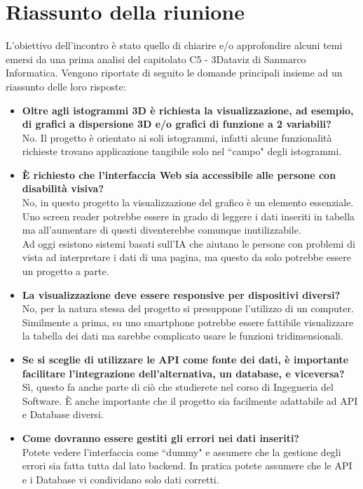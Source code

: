 \section{Riassunto della riunione}
L'obiettivo dell'incontro  è stato quello di chiarire e/o approfondire alcuni temi emersi da una prima analisi del capitolato C5 - 3Dataviz di Sanmarco Informatica.
Vengono riportate di seguito le domande principali insieme ad un riassunto delle loro risposte:
\begin{itemize}
    \item \textbf{Oltre agli istogrammi 3D è richiesta la visualizzazione, ad esempio, di grafici a dispersione 3D e/o grafici di funzione a 2 variabili?}\\
    No. Il progetto è orientato ai soli istogrammi, infatti alcune funzionalità richieste trovano applicazione tangibile solo nel ``campo" degli istogrammi.
    \item \textbf{È richiesto che l'interfaccia Web sia accessibile alle persone con disabilità visiva?}\\
    No, in questo progetto la visualizzazione del grafico è un elemento essenziale. Uno screen reader potrebbe essere in grado di leggere i dati inseriti in tabella ma all'aumentare di questi diventerebbe comunque inutilizzabile.\\
    Ad oggi esistono sistemi basati sull'IA che aiutano le persone con problemi di vista ad interpretare i dati di una pagina, ma questo da solo potrebbe essere un progetto a parte.
    \item \textbf{La visualizzazione deve essere responsive per dispositivi diversi?}\\
    No, per la natura stessa del progetto si presuppone l'utilizzo di un computer.\\
    Similmente a prima, su uno smartphone potrebbe essere fattibile visualizzare la tabella dei dati ma sarebbe complicato usare le funzioni tridimensionali.
    \item \textbf{Se si sceglie di utilizzare le API come fonte dei dati, è importante facilitare l'integrazione dell'alternativa, un database, e viceversa?}\\
    Sì, questo fa anche parte di ciò che studierete nel corso di Ingegneria del Software. È anche importante che il progetto sia facilmente adattabile ad API e Database diversi.
    \item \textbf{Come dovranno essere gestiti gli errori nei dati inseriti?}\\
    Potete vedere l'interfaccia come ``dummy" e assumere che la gestione degli errori sia fatta tutta dal lato backend. In pratica potete assumere che le API e i Database vi condividano solo dati corretti.
\end{itemize}




